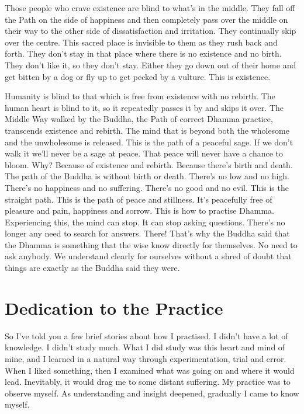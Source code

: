 Those people who crave existence are blind to what's in the middle. They fall off the Path on the side of happiness and then completely pass over the middle on their way to the other side of dissatisfaction and irritation. They continually skip over the centre. This sacred place is invisible to them as they rush back and forth. They don't stay in that place where there is no existence and no birth. They don't like it, so they don't stay. Either they go down out of their home and get bitten by a dog or fly up to get pecked by a vulture. This is existence.

Humanity is blind to that which is free from existence with no rebirth. The human heart is blind to it, so it repeatedly passes it by and skips it over. The Middle Way walked by the Buddha, the Path of correct Dhamma practice, transcends existence and rebirth. The mind that is beyond both the wholesome and the unwholesome is released. This is the path of a peaceful sage. If we don't walk it we'll never be a sage at peace. That peace will never have a chance to bloom. Why? Because of existence and rebirth. Because there's birth and death. The path of the Buddha is without birth or death. There's no low and no high. There's no happiness and no suffering. There's no good and no evil. This is the straight path. This is the path of peace and stillness. It's peacefully free of pleasure and pain, happiness and sorrow. This is how to practise Dhamma. Experiencing this, the mind can stop. It can stop asking questions. There's no longer any need to search for answers. There! That's why the Buddha said that the Dhamma is something that the wise know directly for themselves. No need to ask anybody. We understand clearly for ourselves without a shred of doubt that things are exactly as the Buddha said they were.
\vspace*{\baselineskip}

\section{Dedication to the Practice}

So I've told you a few brief stories about how I practised. I didn't have a lot of knowledge. I didn't study much. What I did study was this heart and mind of mine, and I learned in a natural way through experimentation, trial and error. When I liked something, then I examined what was going on and where it would lead. Inevitably, it would drag me to some distant suffering. My practice was to observe myself. As understanding and insight deepened, gradually I came to know myself.

